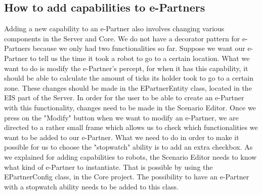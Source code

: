 \subsection{How to add capabilities to e-Partners}
Adding a new capability to an e-Partner also involves changing various components in the Server and Core. We do not have a decorator pattern for e-Partners because we only had two functionalities so far. 
\newline
Suppose we want our e-Partner to tell us the time it took a robot to go to a certain location. What we want to do is modify the e-Partner's percept, for when it has this capability, it should be able to calculate the amount of ticks its holder took to go to a certain zone. These changes should be made in the EPartnerEntity class, located in the EIS part of the Server. 
\newline
\newline 
In order for the user to be able to create an e-Partner with this functionality, changes need to be made in the Scenario Editor. Once we press on the "Modify" button when we want to modify an e-Partner, we are directed to a rather small frame which allows us to check which functionalities we want to be added to our e-Partner. What we need to do in order to make it possible for us to choose the "stopwatch" ability is to add an extra checkbox. 
\newline
As we explained for adding capabilities to robots, the Scenario Editor needs to know what kind of e-Partner to instantiate. That is possible by using the EPartnerConfig class, in the Core project. The possibility to have an e-Partner with a stopwatch ability needs to be added to this class. 
